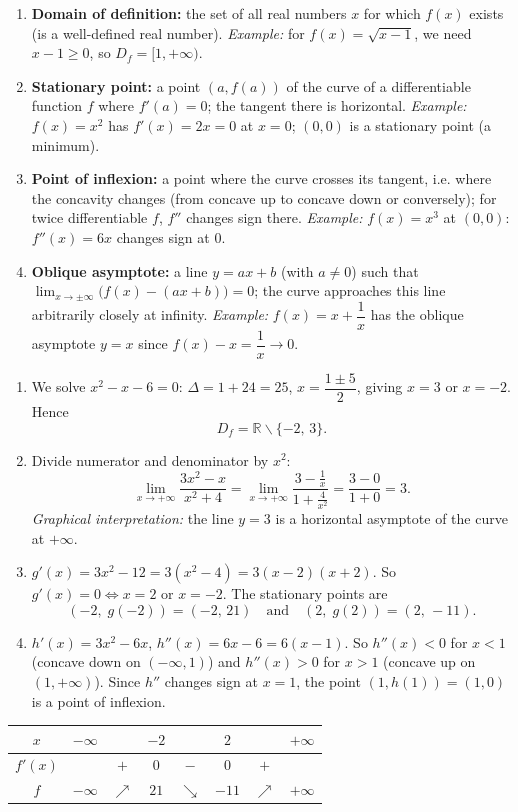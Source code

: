 \documentclass[11pt]{article}
\newcommand{\cle}[1]{{\popxbold\color{popdark}#1}}
\def\setminus{\mathbin{\backslash}}\let\smallsetminus\setminus
\begin{document}
\begin{corrige}
\begin{enumerate}
\item \textbf{Domain of definition:} the set of all real numbers $x$ for which $f(x)$ exists (is a well-defined real number). \emph{Example:} for $f(x)=\sqrt{x-1}$, we need $x-1\geq 0$, so $D_f=[1,+\infty)$.
\item \textbf{Stationary point:} a point $(a,f(a))$ of the curve of a differentiable function $f$ where $f'(a)=0$; the tangent there is horizontal. \emph{Example:} $f(x)=x^{2}$ has $f'(x)=2x=0$ at $x=0$; $(0,0)$ is a stationary point (a minimum).
\item \textbf{Point of inflexion:} a point where the curve crosses its tangent, i.e. where the concavity changes (from concave up to concave down or conversely); for twice differentiable $f$, $f''$ changes sign there. \emph{Example:} $f(x)=x^{3}$ at $(0,0)$: $f''(x)=6x$ changes sign at $0$.
\item \textbf{Oblique asymptote:} a line $y=ax+b$ (with $a\neq 0$) such that $\lim_{x\to\pm\infty}\big(f(x)-(ax+b)\big)=0$; the curve approaches this line arbitrarily closely at infinity. \emph{Example:} $f(x)=x+\dfrac{1}{x}$ has the oblique asymptote $y=x$ since $f(x)-x=\dfrac{1}{x}\to 0$.
\end{enumerate}
\end{corrige}

\begin{corrige}
\begin{enumerate}
\item We solve $x^{2}-x-6=0$: $\Delta=1+24=25$, $x=\dfrac{1\pm 5}{2}$, giving $x=3$ or $x=-2$. Hence
\[ D_f=\mathbb{R}\setminus\{-2,\,3\}. \]
\item Divide numerator and denominator by $x^{2}$:
\[ \lim_{x\to+\infty}\frac{3x^{2}-x}{x^{2}+4}=\lim_{x\to+\infty}\frac{3-\frac{1}{x}}{1+\frac{4}{x^{2}}}=\frac{3-0}{1+0}=3. \]
\emph{Graphical interpretation:} the line $y=3$ is a horizontal asymptote of the curve at $+\infty$.
\item $g'(x)=3x^{2}-12=3(x^{2}-4)=3(x-2)(x+2)$. So $g'(x)=0\iff x=2$ or $x=-2$. The stationary points are
\[ (-2,\;g(-2))=(-2,\,21)\quad\text{and}\quad (2,\;g(2))=(2,\,-11). \]
\item $h'(x)=3x^{2}-6x$, $h''(x)=6x-6=6(x-1)$. So $h''(x)<0$ for $x<1$ (concave down on $(-\infty,1)$) and $h''(x)>0$ for $x>1$ (concave up on $(1,+\infty)$). Since $h''$ changes sign at $x=1$, the point $(1,h(1))=(1,0)$ is a \cle{point of inflexion}.
\end{enumerate}

\begin{center}
\begin{tabular}{|c|ccccccc|}
\hline
$x$ & $-\infty$ & & $-2$ & & $2$ & & $+\infty$ \\
\hline
$f'(x)$ & & $+$ & $0$ & $-$ & $0$ & $+$ & \\
\hline
$f$ & $-\infty$ & $\nearrow$ & $21$ & $\searrow$ & $-11$ & $\nearrow$ & $+\infty$ \\
\hline
\end{tabular}
\end{center}
\end{corrige}
\end{document}
